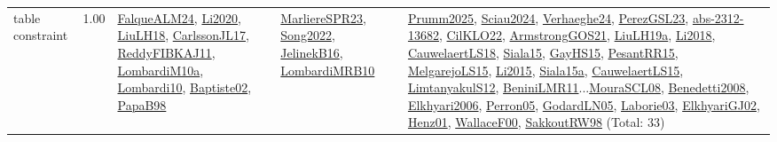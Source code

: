 {\begin{longtable}{p{3cm}r>{\raggedright\arraybackslash}p{6cm}>{\raggedright\arraybackslash}p{6cm}>{\raggedright\arraybackslash}p{8cm}}
\index{table constraint}\index{Constraints!table constraint}table constraint &  1.00 & \hyperref[detail:FalqueALM24]{FalqueALM24}, \hyperref[detail:Li2020]{Li2020}, \hyperref[detail:LiuLH18]{LiuLH18}, \hyperref[detail:CarlssonJL17]{CarlssonJL17}, \hyperref[detail:ReddyFIBKAJ11]{ReddyFIBKAJ11}, \hyperref[detail:LombardiM10a]{LombardiM10a}, \hyperref[detail:Lombardi10]{Lombardi10}, \hyperref[detail:Baptiste02]{Baptiste02}, \hyperref[detail:PapaB98]{PapaB98} & \hyperref[detail:MarliereSPR23]{MarliereSPR23}, \hyperref[detail:Song2022]{Song2022}, \hyperref[detail:JelinekB16]{JelinekB16}, \hyperref[detail:LombardiMRB10]{LombardiMRB10} & \hyperref[detail:Prumm2025]{Prumm2025}, \hyperref[detail:Sciau2024]{Sciau2024}, \hyperref[detail:Verhaeghe24]{Verhaeghe24}, \hyperref[detail:PerezGSL23]{PerezGSL23}, \hyperref[detail:abs-2312-13682]{abs-2312-13682}, \hyperref[detail:CilKLO22]{CilKLO22}, \hyperref[detail:ArmstrongGOS21]{ArmstrongGOS21}, \hyperref[detail:LiuLH19a]{LiuLH19a}, \hyperref[detail:Li2018]{Li2018}, \hyperref[detail:CauwelaertLS18]{CauwelaertLS18}, \hyperref[detail:Siala15]{Siala15}, \hyperref[detail:GayHS15]{GayHS15}, \hyperref[detail:PesantRR15]{PesantRR15}, \hyperref[detail:MelgarejoLS15]{MelgarejoLS15}, \hyperref[detail:Li2015]{Li2015}, \hyperref[detail:Siala15a]{Siala15a}, \hyperref[detail:CauwelaertLS15]{CauwelaertLS15}, \hyperref[detail:LimtanyakulS12]{LimtanyakulS12}, \hyperref[detail:BeniniLMR11]{BeniniLMR11}...\hyperref[detail:MouraSCL08]{MouraSCL08}, \hyperref[detail:Benedetti2008]{Benedetti2008}, \hyperref[detail:Elkhyari2006]{Elkhyari2006}, \hyperref[detail:Perron05]{Perron05}, \hyperref[detail:GodardLN05]{GodardLN05}, \hyperref[detail:Laborie03]{Laborie03}, \hyperref[detail:ElkhyariGJ02]{ElkhyariGJ02}, \hyperref[detail:Henz01]{Henz01}, \hyperref[detail:WallaceF00]{WallaceF00}, \hyperref[detail:SakkoutRW98]{SakkoutRW98} (Total: 33)\\
\end{longtable}
}

\clearpage
